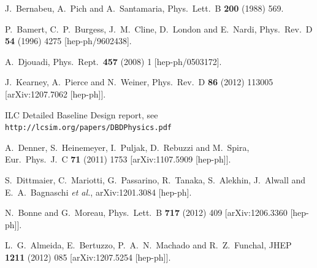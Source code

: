 \documentclass[12pt,a4paper]{article}
\begin{document}
\begin{thebibliography}{99}
  J.~Bernabeu, A.~Pich and A.~Santamaria,
  Phys.\ Lett.\ B {\bf 200} (1988) 569.

  P.~Bamert, C.~P.~Burgess, J.~M.~Cline, D.~London and E.~Nardi,
  Phys.\ Rev.\ D {\bf 54} (1996) 4275
  [hep-ph/9602438].





 A.~Djouadi,
 Phys.\ Rept.\  {\bf 457} (2008) 1
 [hep-ph/0503172].

J.~Kearney, A.~Pierce and N.~Weiner,
Phys.\ Rev.\ D {\bf 86} (2012) 113005
[arXiv:1207.7062 [hep-ph]].



 ILC Detailed Baseline Design report, see
 {\tt http://lcsim.org/papers/DBDPhysics.pdf}


  A.~Denner, S.~Heinemeyer, I.~Puljak, D.~Rebuzzi and M.~Spira,
  Eur.\ Phys.\ J.\ C {\bf 71} (2011) 1753
  [arXiv:1107.5909 [hep-ph]].

  S.~Dittmaier, C.~Mariotti, G.~Passarino, R.~Tanaka, S.~Alekhin, J.~Alwall and E.~A.~Bagnaschi {\it et al.},
  arXiv:1201.3084 [hep-ph].

  
 N.~Bonne and G.~Moreau,
 Phys.\ Lett.\ B {\bf 717} (2012) 409
 [arXiv:1206.3360 [hep-ph]].

  L.~G.~Almeida, E.~Bertuzzo, P.~A.~N.~Machado and R.~Z.~Funchal,
  JHEP {\bf 1211} (2012) 085
  [arXiv:1207.5254 [hep-ph]].


\end{thebibliography}
\end{document}
